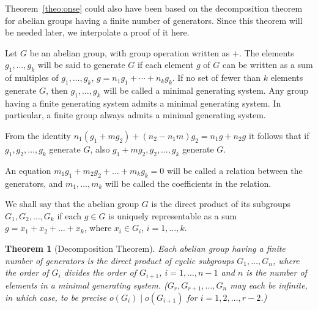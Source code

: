 \documentclass[10pt,leqno]{article}
\newtheorem*{theo*}{Theorem}
\theoremstyle{definition}
\begin{document}
Theorem~\ref{theo:onse} could also have been based on the decomposition theorem for abelian groups having a finite number of generators.
Since this theorem will be needed later, we interpolate a proof of it here.


Let $G$ be an abelian group, with group operation written as $+$.
The elements $g_1, \ldots, g_k$ will be said to generate $G$ if each element $g$ of $G$ can be written as a sum of multiples of $g_1, \ldots, g_k$, $g = n_1g_1 + \cdots + n_k g_k$.
If no set of fewer than $k$ elements generate $G$, then $g_1, \ldots, g_k$ will be called a minimal generating system.
Any group having a finite generating system admits a minimal generating system.
In particular, a finite group always admits a minimal generating system.

From the identity $n_1(g_1 + m g_2) + (n_2 - n_1m) g_2 = n_1 g + n_2 g$ it follows that if $g_1, g_2, \ldots, g_k$ generate $G$, also $g_1 + m g_2, g_2, \ldots, g_k$ generate $G$.

An equation $m_1 g_1 + m_2 g_2 + \ldots + m_k g_k = 0$ will be called a relation between the generators, and $m_1, \ldots, m_k$ will be called the coefficients in the relation.

We shall say that the abelian group $G$ is the direct product of its subgroups $G_1, G_2, \ldots, G_k$ if each $g \in G$ is uniquely representable as a sum $g = x_1 + x_2 + \ldots + x_k$, where $x_i \in G_i$, $i=1,\ldots,k$.


\begin{theo*}[Decomposition Theorem]
Each abelian group having a finite number of generators is the direct product of cyclic subgroups $G_1, \ldots, G_n$, where the order of $G_i$ divides the order of $G_{i+1}$, $i=1,\ldots,n-1$ and $n$ is the number of elements in a minimal generating system.
($G_r, G_{r+1}, \ldots, G_n$ may each be infinite, in which case, to be precise $o(G_i) \mid o(G_{i+1})$ for $i=1,2,\ldots,r-2$.)
\end{theo*}
\end{document}
